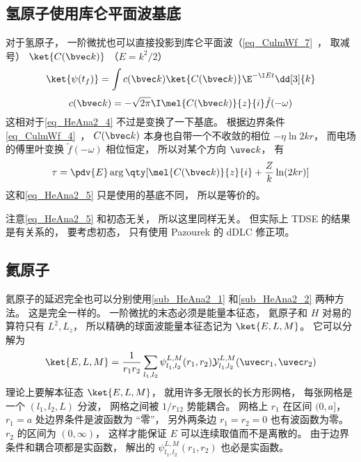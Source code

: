 \subsection{氢原子使用库仑平面波基底}\label{sub_HeAna2_2}
对于氢原子， 一阶微扰也可以直接投影到库仑平面波（\autoref{eq_CulmWf_7}~， 取减号） $\ket{C(\bvec k)}$ （$E = k^2/2$）
\begin{equation}
\ket{\psi(t_f)} = \int c(\bvec k)\ket{C(\bvec k)} \E^{-\I E t} \dd[3]{k}
\end{equation}
\begin{equation}
c(\bvec k) = -\sqrt{2\pi}\I\mel{C(\bvec k)}{z}{i} \tilde f(-\omega)
\end{equation}
这相对于\autoref{eq_HeAna2_4} 不过是变换了一下基底。 根据边界条件\autoref{eq_CulmWf_4}~， $C(\bvec k)$ 本身也自带一个不收敛的相位 $-\eta \ln 2kr$， 而电场的傅里叶变换 $\tilde f(-\omega)$ 相位恒定， 所以对某个方向 $\uvec k$， 有
\begin{equation}
\tau = \pdv{E} \arg\qty[\mel{C(\bvec k)}{z}{i} + \frac{Z}{k}\ln(2kr)]
\end{equation}
这和\autoref{eq_HeAna2_5} 只是使用的基底不同， 所以是等价的。

注意\autoref{eq_HeAna2_5} 和初态无关， 所以这里同样无关。 但实际上 TDSE 的结果是有关系的， 要考虑初态， 只有使用 Pazourek 的 dDLC 修正项。

\subsection{氦原子}
氦原子的延迟完全也可以分别使用\autoref{sub_HeAna2_1} 和\autoref{sub_HeAna2_2} 两种方法。 这是完全一样的。 一阶微扰的末态必须是能量本征态， 氦原子和 $H$ 对易的算符只有 $L^2, L_z$， 所以精确的球面波能量本征态记为 $\ket{E,L,M}$。 它可以分解为
\begin{equation}
\ket{E,L,M} = \frac{1}{r_1r_2}\sum_{l_1,l_2}\psi_{l_1,l_2}^{L, M}(r_1, r_2)\mathcal Y_{l_1,l_2}^{L, M}(\uvec r_1, \uvec r_2)
\end{equation}
理论上要解本征态 $\ket{E,L,M}$， 就用许多无限长的长方形网格， 每张网格是一个 $(l_1,l_2,L)$ 分波， 网格之间被 $1/r_{12}$ 势能耦合。 网格上 $r_1$ 在区间 $(0,a]$， $r_1 = a$ 处边界条件是波函数为 “零”， 另外两条边 $r_1 = r_2 = 0$ 也有波函数为零。 $r_2$ 的区间为 $(0,\infty)$， 这样才能保证 $E$ 可以连续取值而不是离散的。 由于边界条件和耦合项都是实函数， 解出的 $\psi_{l_1,l_2}^{L, M}(r_1, r_2)$ 也必是实函数。

